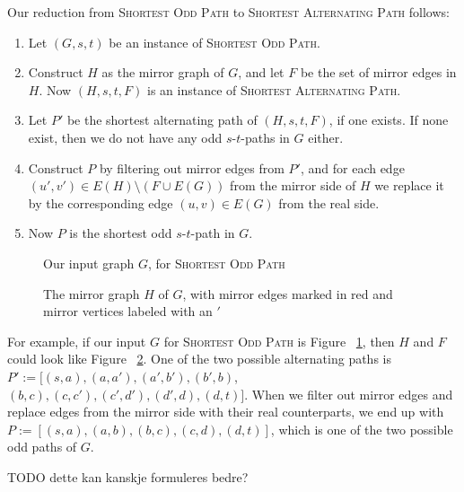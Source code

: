 Our reduction from \textsc{Shortest Odd Path} to \textsc{Shortest Alternating Path} follows:
\begin{enumerate}
    \item Let $(G, s, t)$ be an instance of \textsc{Shortest Odd Path}.
    \item Construct $H$ as the mirror graph of $G$, and let $F$ be the set of mirror edges in $H$. Now $(H, s, t, F)$ is an instance of \textsc{Shortest Alternating Path}.
    \item Let $P'$ be the shortest alternating path of $(H, s, t, F)$, if one exists. If none exist, then we do not have any odd $s$-$t$-paths in $G$ either.
    \item Construct $P$ by filtering out mirror edges from $P'$, and for each edge $(u',v') \in E(H) \setminus (F \cup E(G))$ from the mirror side of $H$ we replace it by the corresponding edge $(u,v) \in E(G)$ from the real side.
    \label{translate_alternating_path}
    \item Now $P$ is the shortest odd $s$-$t$-path in $G$.
\end{enumerate}

\begin{figure}
    \centering
    
    \caption{Our input graph $G$, for \textsc{Shortest Odd Path}}
    \label{small5}
\end{figure}

\begin{figure}
    \centering
    
    \caption{The mirror graph $H$ of $G$, with mirror edges marked in red and mirror vertices labeled with an $'$}
    \label{small5-2}
\end{figure}

For example, if our input $G$ for \textsc{Shortest Odd Path} is Figure ~\ref{small5}, then $H$ and $F$ could look like Figure ~\ref{small5-2}. One of the two possible alternating paths is $P' := [(s,a), (a, a'), (a',b'), (b',b)$, $(b,c), (c,c'), (c',d'), (d',d), (d,t)]$. When we filter out mirror edges and replace edges from the mirror side with their real counterparts, we end up with $P := [(s,a),(a,b),(b,c),(c,d),(d,t)]$, which is one of the two possible odd paths of $G$. 

TODO dette kan kanskje formuleres bedre?

